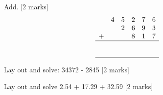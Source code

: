 \documentclass{article}
\begin{document}
\vspace{10pt}
\hline
\vspace{5pt}

\quad Add. \hspace{2cm} [2 marks]
\[
\begin{array}{cccccc}
& 4 & 5 & 2 & 7 & 6 \\
  & & 2 & 6 & 9 & 3 \\
+ & & & 8 & 1 & 7 \\
\hline
&  &  &  &  &  \\
\\ 
\hline 
\end{array}
\]

\vspace{10pt}
\hline
\vspace{5pt}

Lay out and solve: 34372 - 2845 \hspace{2cm} [2 marks]
\vspace{80pt}

\hline
\vspace{10pt}

Lay out and solve 2.54 + 17.29 + 32.59 \hspace{2cm} [2 marks]
\vspace{80pt}

\hline
\vspace{10pt}
\vspace{5pt}
\end{document}
